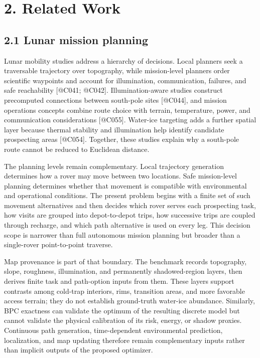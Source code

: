 \documentclass[
  11pt,
]{article}
\begin{document}
\hypertarget{related-work}{%
\section{2. Related Work}\label{related-work}}

\hypertarget{lunar-mission-planning}{%
\subsection{2.1 Lunar mission planning}\label{lunar-mission-planning}}

Lunar mobility studies address a hierarchy of decisions. Local planners
seek a traversable trajectory over topography, while mission-level
planners order scientific waypoints and account for illumination,
communication, failures, and safe reachability {[}@C041; @C042{]}.
Illumination-aware studies construct precomputed connections between
south-pole sites {[}@C044{]}, and mission operations concepts combine
route choice with terrain, temperature, power, and communication
considerations {[}@C055{]}. Water-ice targeting adds a further spatial
layer because thermal stability and illumination help identify candidate
prospecting areas {[}@C054{]}. Together, these studies explain why a
south-pole route cannot be reduced to Euclidean distance.

The planning levels remain complementary. Local trajectory generation
determines how a rover may move between two locations. Safe
mission-level planning determines whether that movement is compatible
with environmental and operational conditions. The present problem
begins with a finite set of such movement alternatives and then decides
which rover serves each prospecting task, how visits are grouped into
depot-to-depot trips, how successive trips are coupled through recharge,
and which path alternative is used on every leg. This decision scope is
narrower than full autonomous mission planning but broader than a
single-rover point-to-point traverse.

Map provenance is part of that boundary. The benchmark records
topography, slope, roughness, illumination, and permanently
shadowed-region layers, then derives finite task and path-option inputs
from them. These layers support contrasts among cold-trap interiors,
rims, transition areas, and more favorable access terrain; they do not
establish ground-truth water-ice abundance. Similarly, BPC exactness can
validate the optimum of the resulting discrete model but cannot validate
the physical calibration of its risk, energy, or shadow proxies.
Continuous path generation, time-dependent environmental prediction,
localization, and map updating therefore remain complementary inputs
rather than implicit outputs of the proposed optimizer.
\end{document}
